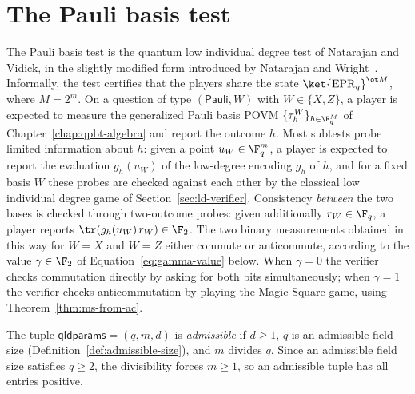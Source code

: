 \section{The Pauli basis test}
\label{sec:qld-game}

The Pauli basis test is the quantum low individual degree test of Natarajan and Vidick, in the slightly modified form introduced by Natarajan and Wright~\cite{Natarajan2018NEEXP}. Informally, the test certifies that the players share the state $\ket{\mathrm{EPR}_q}^{\ot M}$, where $M = 2^m$. On a question of type $(\mathsf{Pauli}, W)$ with $W \in \{X,Z\}$, a player is expected to measure the generalized Pauli basis POVM $\{\tau^W_h\}_{h \in \F_q^M}$ of Chapter~\ref{chap:qpbt-algebra} and report the outcome $h$. Most subtests probe limited information about $h$: given a point $u_W \in \F_q^m$, a player is expected to report the evaluation $g_h(u_W)$ of the low-degree encoding $g_h$ of $h$, and for a fixed basis $W$ these probes are checked against each other by the classical low individual degree game of Section~\ref{sec:ld-verifier}. Consistency \emph{between} the two bases is checked through two-outcome probes: given additionally $r_W \in \F_q$, a player reports $\tr(g_h(u_W)\, r_W) \in \F_2$. The two binary measurements obtained in this way for $W = X$ and $W = Z$ either commute or anticommute, according to the value $\gamma \in \F_2$ of Equation~\eqref{eq:gamma-value} below. When $\gamma = 0$ the verifier checks commutation directly by asking for both bits simultaneously; when $\gamma = 1$ the verifier checks anticommutation by playing the Magic Square game, using Theorem~\ref{thm:ms-from-ac}.

\begin{definition}\label{def:admissible}
	\leanok
	The tuple $\mathsf{qldparams} = (q,m,d)$ is \emph{admissible} if $d \ge 1$, $q$ is an admissible field size (Definition~\ref{def:admissible-size}), and $m$ divides $q$. Since an admissible field size satisfies $q \ge 2$, the divisibility forces $m \ge 1$, so an admissible tuple has all entries positive.
\end{definition}

